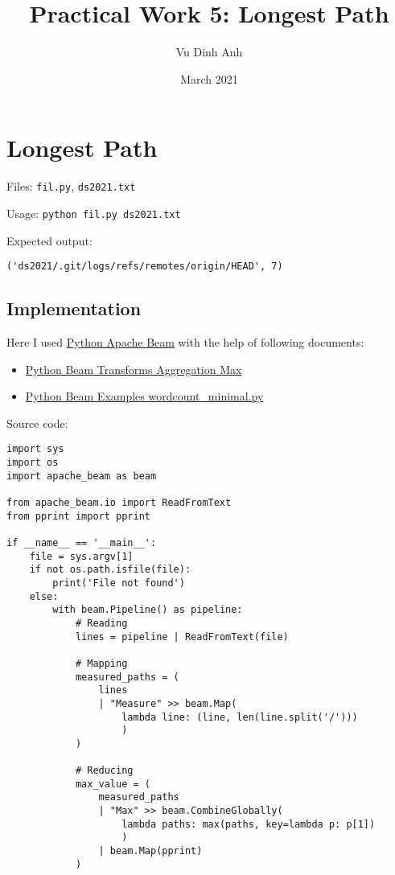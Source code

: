 \documentclass{article}
\title{Practical Work 5: Longest Path}
\author{Vu Dinh Anh}
\date{March 2021}
\begin{document}
\maketitle

\section*{Longest Path}

Files: \texttt{fil.py}, \texttt{ds2021.txt}

Usage: \texttt{python fil.py ds2021.txt}

Expected output:
\begin{verbatim}
('ds2021/.git/logs/refs/remotes/origin/HEAD', 7)
\end{verbatim}

\subsection*{Implementation}

Here I used \href{https://beam.apache.org/get-started/quickstart-py/}{Python Apache Beam} with the help of following documents:

\begin{itemize}
    \item \href{https://beam.apache.org/documentation/transforms/python/aggregation/max/}{Python Beam Transforms Aggregation Max}
    \item \href{https://github.com/apache/beam/blob/master/sdks/python/apache_beam/examples/wordcount_minimal.py}{Python Beam Examples wordcount\_minimal.py}
\end{itemize}

Source code:

\begin{verbatim}
import sys
import os
import apache_beam as beam

from apache_beam.io import ReadFromText
from pprint import pprint

if __name__ == '__main__':
    file = sys.argv[1]
    if not os.path.isfile(file):
        print('File not found')
    else:
        with beam.Pipeline() as pipeline:
            # Reading
            lines = pipeline | ReadFromText(file)

            # Mapping
            measured_paths = (
                lines
                | "Measure" >> beam.Map(
                    lambda line: (line, len(line.split('/')))
                    )
            )

            # Reducing
            max_value = (
                measured_paths
                | "Max" >> beam.CombineGlobally(
                    lambda paths: max(paths, key=lambda p: p[1])
                    )
                | beam.Map(pprint)
            )
\end{verbatim}
\end{document}
